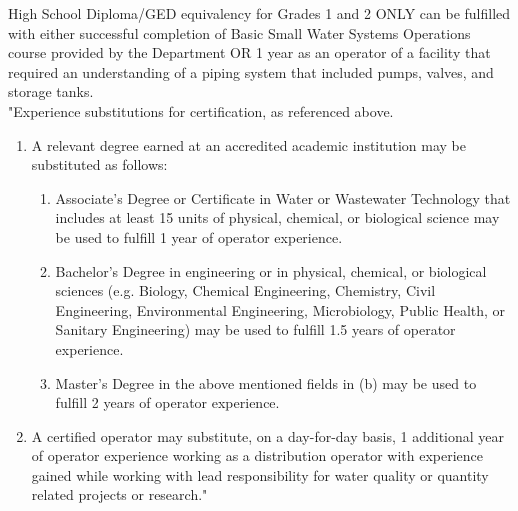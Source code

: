 \documentclass{article}
\begin{document}
\begin{tiny}

High School Diploma/GED equivalency for Grades 1 and 2 ONLY can be fulfilled with either successful completion of Basic Small Water Systems Operations course provided by the Department OR 1 year as an operator of a facility that required an understanding of a piping system that included pumps, valves, and storage tanks.\\

"Experience substitutions for certification, as referenced above.
\begin{enumerate}[]
\item A relevant degree earned at an accredited academic institution may be substituted as follows:
\begin{enumerate}[label=(\alph*)]
\item Associate’s Degree or Certificate in Water or Wastewater Technology that includes at least 15 units of physical, chemical, or biological science may be used to fulfill 1 year of operator experience.
\item Bachelor’s Degree in engineering or in physical, chemical, or biological sciences (e.g. Biology, Chemical Engineering, Chemistry, Civil Engineering, Environmental Engineering, Microbiology, Public Health, or Sanitary Engineering) may be used to fulfill 1.5 years of operator experience.
\item Master’s Degree in the above mentioned fields in (b) may be used to fulfill 2 years of operator experience.
\end{enumerate}
\item A certified operator may substitute, on a day-for-day basis, 1 additional year of operator experience working as a distribution operator with experience gained while working with lead responsibility for water quality or quantity related projects or research."	
\end{enumerate}	
\end{tiny}
\end{document}
